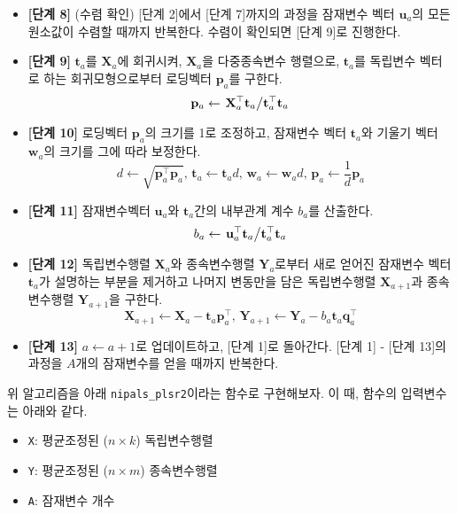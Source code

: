 \documentclass[]{book}
\providecommand{\tightlist}{%
  \setlength{\itemsep}{0pt}\setlength{\parskip}{0pt}}
\begin{document}
\begin{itemize}
\item
  \textbf{{[}단계 8{]}} (수렴 확인) {[}단계 2{]}에서 {[}단계 7{]}까지의 과정을 잠재변수 벡터 \(\mathbf{u}_a\)의 모든 원소값이 수렴할 때까지 반복한다. 수렴이 확인되면 {[}단계 9{]}로 진행한다.
\item
  \textbf{{[}단계 9{]}} \(\mathbf{t}_a\)를 \(\mathbf{X}_a\)에 회귀시켜, \(\mathbf{X}_a\)을 다중종속변수 행렬으로, \(\mathbf{t}_a\)를 독립변수 벡터로 하는 회귀모형으로부터 로딩벡터 \(\mathbf{p}_a\)를 구한다.
  \[\mathbf{p}_a \leftarrow \left. \mathbf{X}_a^\top \mathbf{t}_a \middle/ \mathbf{t}_a^\top \mathbf{t}_a \right.\]
\item
  \textbf{{[}단계 10{]}} 로딩벡터 \(\mathbf{p}_a\)의 크기를 1로 조정하고, 잠재변수 벡터 \(\mathbf{t}_a\)와 기울기 벡터 \(\mathbf{w}_a\)의 크기를 그에 따라 보정한다.
  \[d \leftarrow \sqrt{\mathbf{p}_a^\top \mathbf{p}_a}, \, \mathbf{t}_a \leftarrow \mathbf{t}_a d, \, \mathbf{w}_a \leftarrow \mathbf{w}_a d, \, \mathbf{p}_a \leftarrow \frac{1}{d} \mathbf{p}_a \]
\item
  \textbf{{[}단계 11{]}} 잠재변수벡터 \(\mathbf{u}_a\)와 \(\mathbf{t}_a\)간의 내부관계 계수 \(b_a\)를 산출한다.
  \[b_a \leftarrow \left. \mathbf{u}_a^\top \mathbf{t}_a \middle/ \mathbf{t}_a^\top \mathbf{t}_a \right. \]
\item
  \textbf{{[}단계 12{]}} 독립변수행렬 \(\mathbf{X}_a\)와 종속변수행렬 \(\mathbf{Y}_a\)로부터 새로 얻어진 잠재변수 벡터 \(\mathbf{t}_a\)가 설명하는 부분을 제거하고 나머지 변동만을 담은 독립변수행렬 \(\mathbf{X}_{a + 1}\)과 종속변수행렬 \(\mathbf{Y}_{a + 1}\)을 구한다.
  \[\mathbf{X}_{a + 1} \leftarrow \mathbf{X}_a - \mathbf{t}_a \mathbf{p}_a^\top, \, \mathbf{Y}_{a + 1} \leftarrow \mathbf{Y}_a - b_a \mathbf{t}_a \mathbf{q}_a^\top \]
\item
  \textbf{{[}단계 13{]}} \(a \leftarrow a + 1\)로 업데이트하고, {[}단계 1{]}로 돌아간다. {[}단계 1{]} - {[}단계 13{]}의 과정을 \(A\)개의 잠재변수를 얻을 때까지 반복한다.
\end{itemize}

위 알고리즘을 아래 \texttt{nipals\_plsr2}이라는 함수로 구현해보자. 이 때, 함수의 입력변수는 아래와 같다.

\begin{itemize}
\tightlist
\item
  \texttt{X}: 평균조정된 (\(n \times k\)) 독립변수행렬
\item
  \texttt{Y}: 평균조정된 (\(n \times m\)) 종속변수행렬
\item
  \texttt{A}: 잠재변수 개수
\end{itemize}
\end{document}
